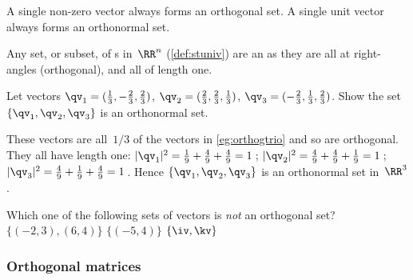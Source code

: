 A single non-zero vector always forms an orthogonal set.  
A single unit vector always forms an orthonormal set.


\begin{example} \label{eg:}
Any set, or subset, of s in~\(\RR^n\) (\autoref{def:stuniv}) are an  as they are all at right-angles (orthogonal), and all of length one.
\end{example}

\begin{example} \label{eg:}
Let vectors \(\qv_1=(\frac13,-\frac23,\frac23)\), \(\qv_2=(\frac23,\frac23,\frac13)\), \(\qv_3=(-\frac23,\frac13,\frac23)\).  
Show the set \(\{\qv_1,\qv_2,\qv_3\}\) is an orthonormal set.
\begin{solution} 
These vectors are all~\(1/3\) of the vectors in \autoref{eg:orthogtrio} and so are orthogonal.
They all have length one:
\(|\qv_1|^2={\frac19+\frac49+\frac49}=1\)\,;
\(|\qv_2|^2={\frac49+\frac49+\frac19}=1\)\,;
\(|\qv_3|^2={\frac49+\frac19+\frac49}=1\)\,.
Hence \(\{\qv_1,\qv_2,\qv_3\}\) is an orthonormal set in~\(\RR^3\). 
\end{solution}
\end{example}



\begin{activity}
Which one of the following sets of vectors is \emph{not} an orthogonal set?
{\(\{(-2,3),(6,4)\}\)}
{\(\{(-5,4)\}\)}
{\(\{\iv,\kv\}\)}
\end{activity}





\subsubsection{Orthogonal matrices}

